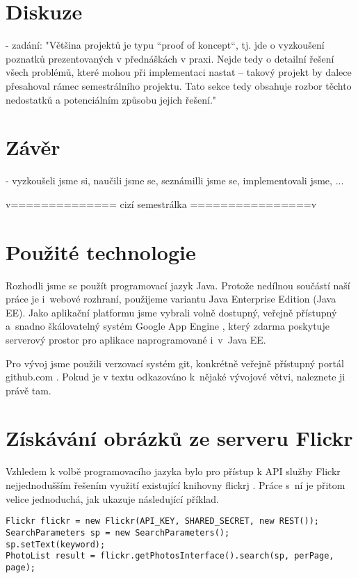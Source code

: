 \documentclass[12pt,oneside,a4paper]{article}
\newenvironment{listing}
{\begin{list}{}{\setlength{\leftmargin}{1em}}\item\scriptsize\bfseries}
{\end{list}}
\begin{document}
\section{Diskuze}
- zadání: "Většina projektů je typu “proof of koncept“, tj. jde o vyzkoušení poznatků
prezentovaných v přednáškách v praxi. Nejde tedy o detailní řešení všech problémů,
které mohou při implementaci nastat – takový projekt by dalece přesahoval rámec
semestrálního projektu. Tato sekce tedy obsahuje rozbor těchto nedostatků a
potenciálním způsobu jejich řešení."

\section{Závěr}
- vyzkoušeli jsme si, naučili jsme se, seznámilli jsme se, implementovali jsme, ...

v============== cizí semestrálka ================v

\section{Použité technologie}

Rozhodli jsme se použít programovací jazyk Java. Protože nedílnou součástí naší práce je i~webové rozhraní, použijeme variantu Java Enterprise Edition (Java EE). Jako aplikační platformu jsme vybrali volně dostupný, veřejně přístupný a~snadno škálovatelný systém Google App Engine \cite{GoogleAE}, který zdarma poskytuje serverový prostor pro aplikace naprogramované i~v~Java EE.

Pro vývoj jsme použili verzovací systém git, konkrétně veřejně přístupný portál github.com \cite{official}. Pokud je v textu odkazováno k~nějaké vývojové větvi, naleznete ji právě tam.

\section{Získávání obrázků ze serveru Flickr}
Vzhledem k volbě programovacího jazyka bylo pro přístup k API služby Flickr nejjednodušším řešením využití existující knihovny flickrj \cite{flickrj}. Práce s~ní je přitom velice jednoduchá, jak ukazuje následující příklad.

\begin{listing}
\begin{verbatim}
Flickr flickr = new Flickr(API_KEY, SHARED_SECRET, new REST());
SearchParameters sp = new SearchParameters();
sp.setText(keyword);
PhotoList result = flickr.getPhotosInterface().search(sp, perPage, page);
\end{verbatim}
\end{listing}
\end{document}
